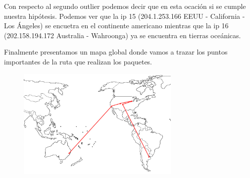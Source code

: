 Con respecto al segundo outlier podemos decir que en esta ocaci\'on si se cumple nuestra hip\'otesis. Podemos ver que la ip 15 (204.1.253.166    EEUU - California - Los \'Angeles) se encuetra en el continente americano mientras que la ip 16 (202.158.194.172  Australia - Wahroonga) ya se encuentra en tierras oce\'anicas. \newline

Finalmente presentamos un mapa global donde vamos a trazar los puntos importantes de la ruta que realizan los paquetes. 

\begin{figure}[h]
    \includegraphics[width=0.7\textwidth]{img_analisis2/mapa-analisis2.jpg}
\end{figure}
\vspace{0.25cm}
